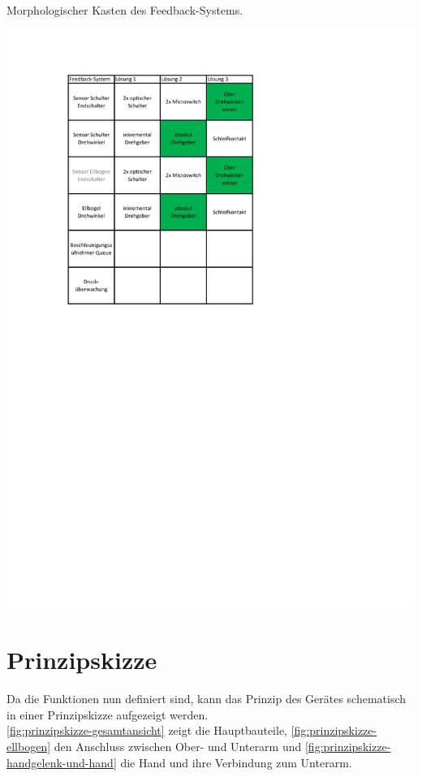 	\begin{table}[h]
		\caption[Morphologischer Kasten des Feedback-Systems]{Morphologischer Kasten des Feedback-Systems.}
		\centering
		\includegraphics[width=\textwidth]{"Abb/Morphologischer Kasten Feedback-System"}
		\label{fig:morphologische-kasten-feedback-system}
	\end{table}

\section{Prinzipskizze}
	Da die Funktionen nun definiert sind, kann das Prinzip des Gerätes schematisch in einer Prinzipskizze aufgezeigt werden.\\
	\cref{fig:prinzipskizze-gesamtansicht} zeigt die Hauptbauteile, \cref{fig:prinzipskizze-ellbogen} den Anschluss zwischen Ober- und Unterarm und \cref{fig:prinzipskizze-handgelenk-und-hand} die Hand und ihre Verbindung zum Unterarm.

